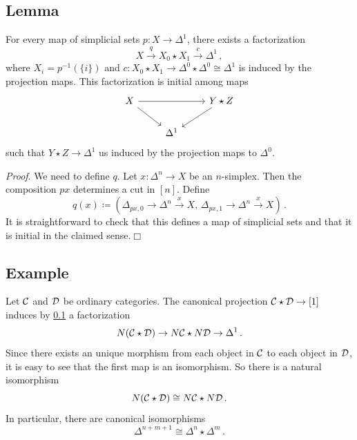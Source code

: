     \subsection{Lemma}\label{chVI-3-9}
        For every map of simplicial sets $p \colon X \to \Delta^1$, there exists a factorization
        \begin{equation*}
            X \xrightarrow{q} X_0 \star X_1 \xrightarrow{c} \Delta^1 \,,
        \end{equation*}
        where $X_i = p^{-1}(\{i\})$ and $c \colon X_0 \star X_1 \to \Delta^0 \star \Delta^0 \cong \Delta^1$ is induced by the projection maps. This factorization is initial among maps
        \begin{equation*}
            \begin{tikzcd}
                X \arrow[dr] \arrow[rr] & & Y \star Z \arrow[dl] \\
                & \Delta^1 & 
            \end{tikzcd}
        \end{equation*}
        such that $Y \star Z \to \Delta^1$ us induced by the projection maps to $\Delta^0$.
        \smallskip

        \emph{Proof}. We need to define $q$. Let $x \colon \Delta^n \to X$ be an $n$-simplex. Then the composition $p x$ determines a cut in $[n]$. Define
        \begin{equation*}
            q(x) \coloneq (\Delta_{px,0} \to \Delta^n \xrightarrow{x} X,\, \Delta_{px,1} \to \Delta^n \xrightarrow{x} X) \,.
        \end{equation*}
        It is straightforward to check that this defines a map of simplicial sets and that it is initial in the claimed sense.\hfill$\Box$

    \subsection{Example}\label{chVI-3-10}
        Let $\mathcal{C}$ and $\mathcal{D}$ be ordinary categories. The canonical projection $\mathcal{C} \star \mathcal{D} \to [1]$ induces by \ref{chVI-3-9} a factorization
        \begin{equation*}
            N(\mathcal{C} \star \mathcal{D}) \to N \mathcal{C} \star N \mathcal{D} \to \Delta^1 \,.
        \end{equation*}
        Since there exists an unique morphism from each object in $\mathcal{C}$ to each object in $\mathcal{D}$, it is easy to see that the first map is an isomorphism. So there is a natural isomorphism
        \begin{equation*}
            N(\mathcal{C} \star \mathcal{D}) \cong N \mathcal{C} \star N \mathcal{D} \,.
        \end{equation*}
        In particular, there are canonical isomorphisms
        \begin{equation*}
            \Delta^{n+m+1} \cong \Delta^n \star \Delta^m \,.
        \end{equation*}

